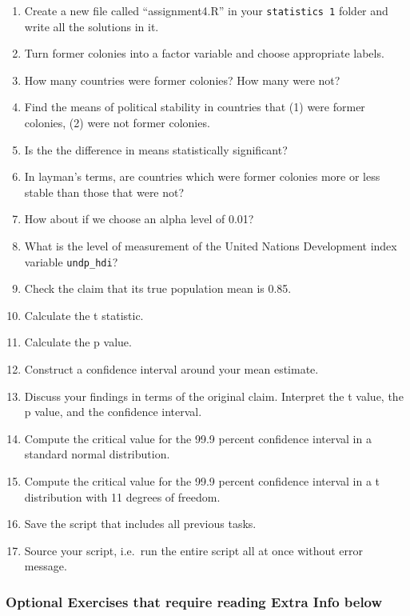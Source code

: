 \documentclass[]{article}
\providecommand{\tightlist}{%
  \setlength{\itemsep}{0pt}\setlength{\parskip}{0pt}}
\theoremstyle{definition}
\theoremstyle{definition}
\theoremstyle{definition}
\theoremstyle{remark}
\begin{document}
\begin{enumerate}
\def\labelenumi{\arabic{enumi}.}
\tightlist
\item
  Create a new file called ``assignment4.R'' in your
  \texttt{statistics\ 1} folder and write all the solutions in it.
\item
  Turn former colonies into a factor variable and choose appropriate
  labels.
\item
  How many countries were former colonies? How many were not?
\item
  Find the means of political stability in countries that (1) were
  former colonies, (2) were not former colonies.
\item
  Is the the difference in means statistically significant?
\item
  In layman's terms, are countries which were former colonies more or
  less stable than those that were not?
\item
  How about if we choose an alpha level of 0.01?
\item
  What is the level of measurement of the United Nations Development
  index variable \texttt{undp\_hdi}?
\item
  Check the claim that its true population mean is 0.85.
\item
  Calculate the t statistic.
\item
  Calculate the p value.
\item
  Construct a confidence interval around your mean estimate.
\item
  Discuss your findings in terms of the original claim. Interpret the t
  value, the p value, and the confidence interval.
\item
  Compute the critical value for the 99.9 percent confidence interval in
  a standard normal distribution.
\item
  Compute the critical value for the 99.9 percent confidence interval in
  a t distribution with 11 degrees of freedom.
\item
  Save the script that includes all previous tasks.
\item
  Source your script, i.e.~run the entire script all at once without
  error message.
\end{enumerate}

\subsubsection{Optional Exercises that require reading Extra Info
below}\label{optional-exercises-that-require-reading-extra-info-below}
\end{document}
